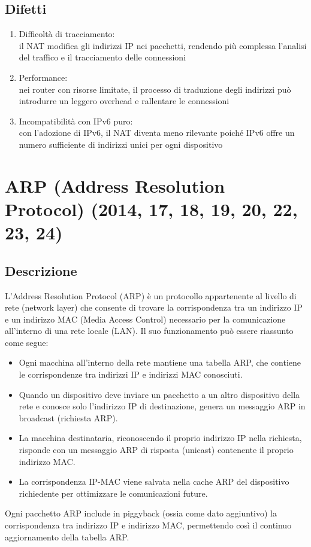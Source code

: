 \documentclass[10pt,oneside,a4paper]{article}
\begin{document}
\subsection{Difetti}
\begin{enumerate}
\item Difficoltà di tracciamento:\\
il NAT modifica gli indirizzi IP nei pacchetti, rendendo più complessa l'analisi del traffico e il tracciamento delle connessioni
\item Performance:\\
nei router con risorse limitate, il processo di traduzione degli indirizzi può introdurre un leggero overhead e rallentare le connessioni
\item Incompatibilità con IPv6 puro:\\
con l'adozione di IPv6, il NAT diventa meno rilevante poiché IPv6 offre un numero sufficiente di indirizzi unici per ogni dispositivo
\end{enumerate}
\section{ARP (Address Resolution Protocol) (2014, 17, 18, 19, 20, 22, 23, 24)}
\subsection{Descrizione}
L'Address Resolution Protocol (ARP) è un protocollo appartenente al livello di rete (network layer) che consente di trovare la corrispondenza tra un indirizzo IP e un indirizzo MAC (Media Access Control) necessario per la comunicazione all'interno di una rete locale (LAN).
Il suo funzionamento può essere riassunto come segue:
\begin{itemize}
\item Ogni macchina all'interno della rete mantiene una tabella ARP, che contiene le corrispondenze tra indirizzi IP e indirizzi MAC conosciuti.
\item Quando un dispositivo deve inviare un pacchetto a un altro dispositivo della rete e conosce solo l'indirizzo IP di destinazione, genera un messaggio ARP in broadcast (richiesta ARP).
\item La macchina destinataria, riconoscendo il proprio indirizzo IP nella richiesta, risponde con un messaggio ARP di risposta (unicast) contenente il proprio indirizzo MAC.
\item La corrispondenza IP-MAC viene salvata nella cache ARP del dispositivo richiedente per ottimizzare le comunicazioni future.
\end{itemize}
Ogni pacchetto ARP include in piggyback (ossia come dato aggiuntivo) la corrispondenza tra indirizzo IP e indirizzo MAC, permettendo così il continuo aggiornamento della tabella ARP.
\end{document}
